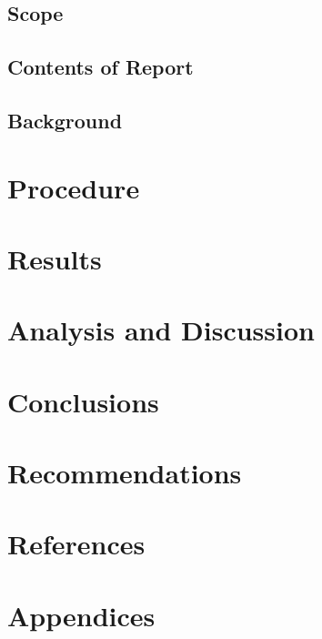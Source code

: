 \documentclass[12pt]{report}
\begin{document}
	\section{Scope} %
	
	\section{Contents of Report}
	
	\section{Background}
	
	\chapter{Procedure}
	
	\chapter{Results}
	
	\chapter{Analysis and Discussion}
	
	\chapter{Conclusions}
	
	\chapter{Recommendations}
	
	\chapter{References}
	
	\chapter{Appendices}
	
	
\end{document}
